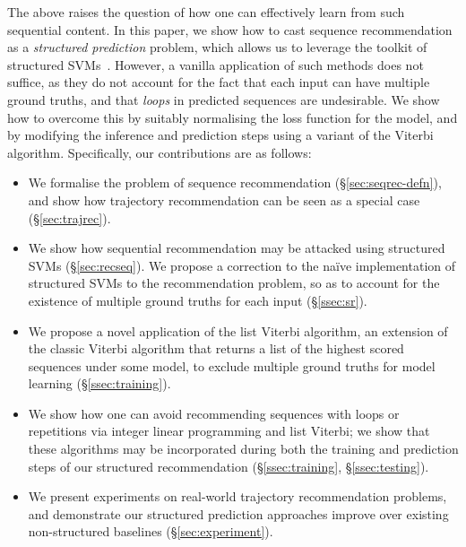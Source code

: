 The above raises the question of how one can effectively learn from such sequential content.
In this paper, we show how to cast sequence recommendation as a \emph{structured prediction} problem,
which allows us to leverage the toolkit of structured SVMs~\citep{tsochantaridis2005large}.
However, a vanilla application of such methods does not suffice,
as they do not account for the fact that each input can have multiple ground truths,
and that \emph{loops} in predicted sequences are undesirable.
We show how to overcome this by
suitably normalising the loss function for the model,
and by modifying the inference and prediction steps using a variant of the Viterbi algorithm.
Specifically, our contributions are as follows:
\begin{itemize}[noitemsep,leftmargin=12pt]\itemmoveup
	\item We formalise the problem of sequence recommendation (\S\ref{sec:seqrec-defn}), and show how trajectory recommendation can be seen as a special case (\S\ref{sec:trajrec}).

	\item We show how sequential recommendation may be attacked using structured SVMs (\S\ref{sec:recseq}).
	We propose a correction to the na\"{i}ve implementation of structured SVMs to the recommendation problem, so as to account for the existence of multiple ground truths for each input (\S\ref{ssec:sr}).

    \item We propose a novel application of the list Viterbi algorithm, an extension of the classic Viterbi algorithm that returns a list of the highest scored sequences under some model, to exclude multiple ground truths for model learning (\S\ref{ssec:training}).
	
	\item We show how one can avoid recommending sequences with loops or repetitions via integer linear programming and list Viterbi;
we show that these algorithms may be incorporated during both the training %
	and prediction steps of our structured recommendation (\S\ref{ssec:training}, \S\ref{ssec:testing}).
	
	\item We present experiments on real-world trajectory recommendation problems, and demonstrate our structured prediction approaches improve over existing non-structured baselines (\S\ref{sec:experiment}).\itemmoveup
\end{itemize}

